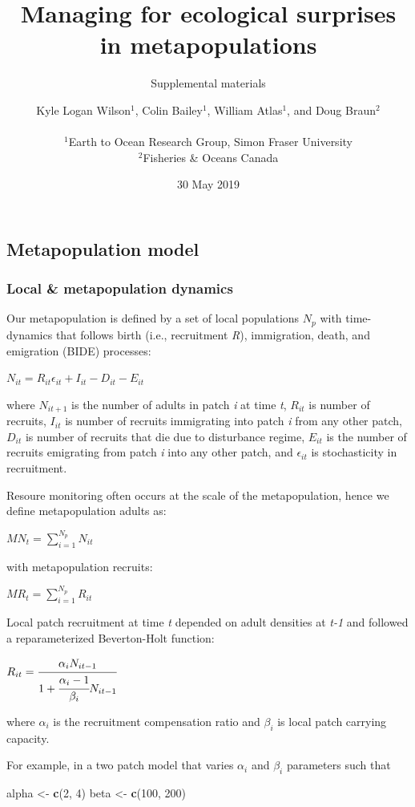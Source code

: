 \documentclass[]{article}
\title{Managing for ecological surprises in metapopulations}
\subtitle{Supplemental materials}
\author{Kyle Logan Wilson\(^1\), Colin Bailey\(^1\), William Atlas\(^1\), and
Doug Braun\(^2\)\\
~\\
\(^1\)Earth to Ocean Research Group, Simon Fraser University\\
\(^2\)Fisheries \& Oceans Canada}
\date{30 May 2019}
\newenvironment{Shaded}{\begin{snugshade}}{\end{snugshade}}
\newcommand{\DecValTok}[1]{\textcolor[rgb]{0.00,0.00,0.81}{#1}}
\newcommand{\KeywordTok}[1]{\textcolor[rgb]{0.13,0.29,0.53}{\textbf{#1}}}
\newcommand{\NormalTok}[1]{#1}
\newcommand{\StringTok}[1]{\textcolor[rgb]{0.31,0.60,0.02}{#1}}
\begin{document}
\maketitle

\hypertarget{metapopulation-model}{%
\subsection{Metapopulation model}\label{metapopulation-model}}

\hypertarget{local-metapopulation-dynamics}{%
\subsubsection{Local \& metapopulation
dynamics}\label{local-metapopulation-dynamics}}

Our metapopulation is defined by a set of local populations \(N_p\) with
time-dynamics that follows birth (i.e., recruitment \emph{R}),
immigration, death, and emigration (BIDE) processes:

\(N_{it}= R_{it}\epsilon_{it}+I_{it}-D_{it}-E_{it}\)

where \(N_{it+1}\) is the number of adults in patch \emph{i} at time
\emph{t}, \(R_{it}\) is number of recruits, \(I_{it}\) is number of
recruits immigrating into patch \emph{i} from any other patch,
\(D_{it}\) is number of recruits that die due to disturbance regime,
\(E_{it}\) is the number of recruits emigrating from patch \emph{i} into
any other patch, and \(\epsilon_{it}\) is stochasticity in recruitment.

Resoure monitoring often occurs at the scale of the metapopulation,
hence we define metapopulation adults as:

\({MN}_t = \sum_{i=1}^{N_p} N_{it}\)

with metapopulation recruits:

\(MR_t = \sum_{i=1}^{N_p} R_{it}\)

Local patch recruitment at time \emph{t} depended on adult densities at
\emph{t-1} and followed a reparameterized Beverton-Holt function:

\(R_{it}=\cfrac{\alpha_iN_{it-1}}{1+\cfrac{\alpha_i-1}{\beta_i}N_{it-1}}\)

where \(\alpha_i\) is the recruitment compensation ratio and \(\beta_i\)
is local patch carrying capacity.

For example, in a two patch model that varies \(\alpha_i\) and
\(\beta_i\) parameters such that

\begin{Shaded}
\begin{Highlighting}[]
\NormalTok{alpha <-}\StringTok{ }\KeywordTok{c}\NormalTok{(}\DecValTok{2}\NormalTok{, }\DecValTok{4}\NormalTok{)}
\NormalTok{beta <-}\StringTok{ }\KeywordTok{c}\NormalTok{(}\DecValTok{100}\NormalTok{, }\DecValTok{200}\NormalTok{)}
\end{Highlighting}
\end{Shaded}
\end{document}

